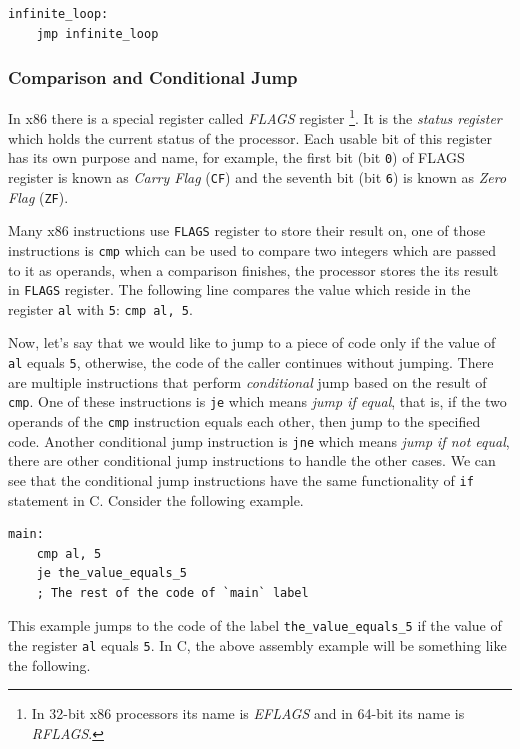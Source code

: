 \begin{lstlisting}
infinite_loop:
    jmp infinite_loop
\end{lstlisting}

\subsubsection{Comparison and Conditional
Jump}\label{comparison-and-conditional-jump}

In x86 there is a special register called \emph{FLAGS} register
\footnote{In 32-bit x86 processors its name is \emph{EFLAGS} and in
  64-bit its name is \emph{RFLAGS}.}. It is the \emph{status register}
which holds the current status of the processor. Each usable bit of this
register has its own purpose and name, for example, the first bit (bit
\lstinline!0!) of FLAGS register is known as \emph{Carry Flag}
(\lstinline!CF!) and the seventh bit (bit \lstinline!6!) is known as
\emph{Zero Flag} (\lstinline!ZF!).

Many x86 instructions use \lstinline!FLAGS! register to store their
result on, one of those instructions is \lstinline!cmp! which can be
used to compare two integers which are passed to it as operands, when a
comparison finishes, the processor stores the its result in
\lstinline!FLAGS! register. The following line compares the value which
reside in the register \lstinline!al! with \lstinline!5!:
\lstinline!cmp al, 5!.

Now, let's say that we would like to jump to a piece of code only if the
value of \lstinline!al! equals \lstinline!5!, otherwise, the code of the
caller continues without jumping. There are multiple instructions that
perform \emph{conditional} jump based on the result of \lstinline!cmp!.
One of these instructions is \lstinline!je! which means \emph{jump if
equal}, that is, if the two operands of the \lstinline!cmp! instruction
equals each other, then jump to the specified code. Another conditional
jump instruction is \lstinline!jne! which means \emph{jump if not
equal}, there are other conditional jump instructions to handle the
other cases. We can see that the conditional jump instructions have the
same functionality of \lstinline!if! statement in C. Consider the
following example.

\begin{lstlisting}
main:
    cmp al, 5
    je the_value_equals_5
    ; The rest of the code of `main` label
\end{lstlisting}

This example jumps to the code of the label
\lstinline!the_value_equals_5! if the value of the register
\lstinline!al! equals \lstinline!5!. In C, the above assembly example
will be something like the following.

